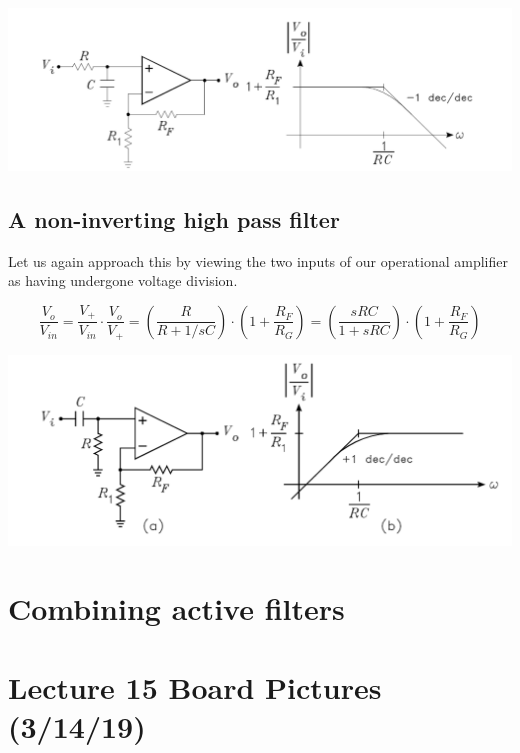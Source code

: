 \documentclass[11pt]{book}
\begin{document}
\begin{center}
	\includegraphics[width=\textwidth]{figures/15.04.png}
\end{center}

\subsection{A non-inverting high pass filter}

Let us again approach this  by viewing the two inputs of our operational amplifier as having undergone voltage division.

\begin{equation}
	\frac{V_o}{V_{in}} = \frac{V_+}{V_{in}}\cdot \frac{V_o}{V_+} = \left(\frac{R}{R+ 1/sC}\right)\cdot\left(1+ \frac{R_F}{R_G}\right) = \left(\frac{sRC}{1 + sRC}\right)\cdot\left(1+ \frac{R_F}{R_G}\right) 
\end{equation}

\begin{center}
	\includegraphics[width=\textwidth]{figures/15.05.png}
\end{center}


\section{Combining active filters}


\section{Lecture 15 Board Pictures (3/14/19)}
\end{document}
